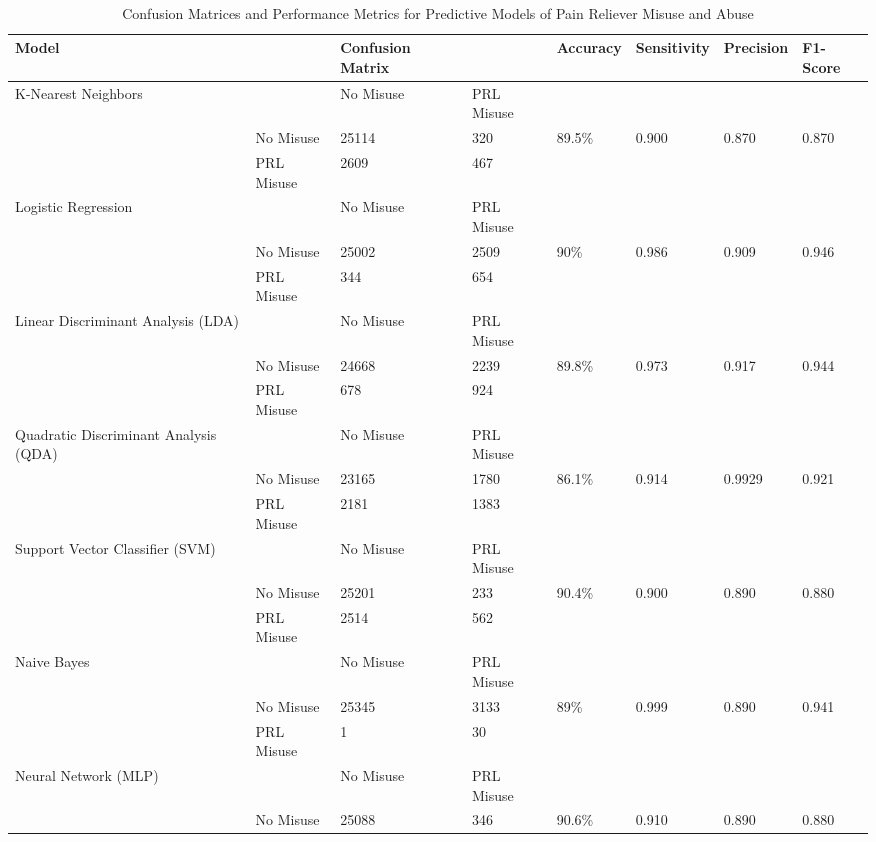 \\\documentclass[sigconf]{acmart}
\begin{document}
 
\begin{table*}[ht]
  \caption{Confusion Matrices and Performance Metrics for Predictive Models of 
  Pain Reliever Misuse and Abuse}
  \label{tab:freq}
  \begin{tabular}{llllllll}
    \toprule
    Model& & Confusion Matrix & & Accuracy & Sensitivity & Precision & F1-Score \\
    \midrule
    K-Nearest Neighbors & & No Misuse & PRL Misuse &  &  &  & \\
     & No Misuse & 25114 & 320 & 89.5\% & 0.900 & 0.870 & 0.870 \\
     & PRL Misuse & 2609 & 467 &  &  &  & \\
    \midrule
    Logistic Regression & & No Misuse & PRL Misuse &  &  &  & \\
     & No Misuse & 25002 & 2509 & 90\% & 0.986 & 0.909 & 0.946 \\
     & PRL Misuse & 344 & 654 &  &  &  & \\
    \midrule
    Linear Discriminant Analysis (LDA) & & No Misuse & PRL Misuse &  &  &  & \\
     & No Misuse & 24668 & 2239 & 89.8\% & 0.973 & 0.917 & 0.944 \\
     & PRL Misuse & 678 & 924 &  &  &  & \\
    \midrule
    Quadratic Discriminant Analysis (QDA) & & No Misuse & PRL Misuse &  &  &  & \\
     & No Misuse & 23165 & 1780 & 86.1\% & 0.914 & 0.9929 & 0.921 \\
     & PRL Misuse & 2181 & 1383 &  &  &  & \\
    \midrule
    Support Vector Classifier (SVM) & & No Misuse & PRL Misuse &  &  &  & \\
     & No Misuse & 25201 & 233 & 90.4\% & 0.900 & 0.890 & 0.880 \\
     & PRL Misuse & 2514 & 562 &  &  &  & \\
    \midrule
    Naive Bayes & & No Misuse & PRL Misuse &  &  &  & \\
     & No Misuse & 25345 & 3133 & 89\% & 0.999 & 0.890 & 0.941 \\
     & PRL Misuse & 1 & 30 &  &  &  & \\
    \midrule
    Neural Network (MLP) & & No Misuse & PRL Misuse &  &  &  & \\
     & No Misuse & 25088 & 346 & 90.6\% & 0.910 & 0.890 & 0.880 \\

\end{tabular}
\end{table*}
\end{document}
